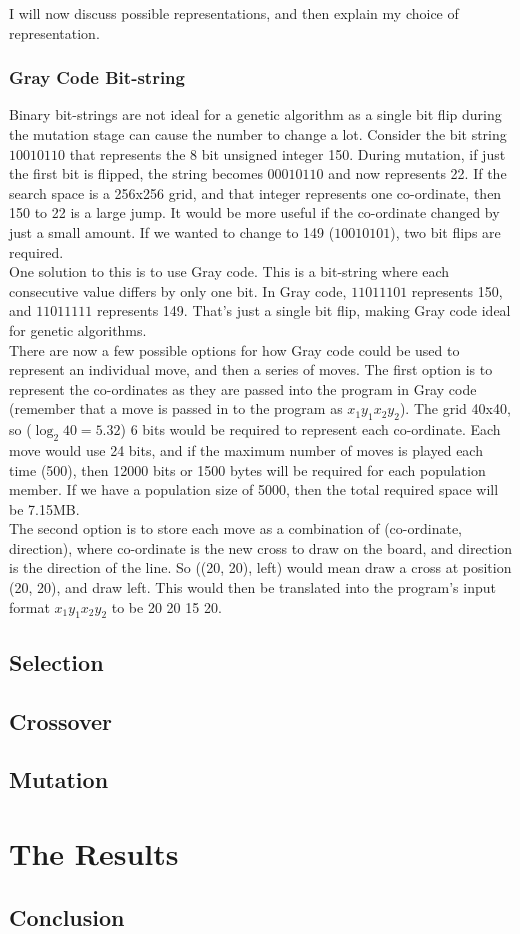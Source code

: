\documentclass[]{report}
\begin{document}
I will now discuss possible representations, and then explain my choice of representation.

\subsection{Gray Code Bit-string}

Binary bit-strings are not ideal for a genetic algorithm as a single bit flip during the mutation stage can cause the number to change a lot. Consider the bit string $10010110$ that represents the 8 bit unsigned integer 150. During mutation, if just the first bit is flipped, the string becomes $00010110$ and now represents 22. If the search space is a 256x256 grid, and that integer represents one co-ordinate, then 150 to 22 is a large jump. It would be more useful if the co-ordinate changed by just a small amount. If we wanted to change to 149 ($10010101$), two bit flips are required. \\

One solution to this is to use Gray code. This is a bit-string where each consecutive value differs by only one bit. In Gray code, $11011101$ represents 150, and $11011111$ represents 149. That's just a single bit flip, making Gray code ideal for genetic algorithms. \\

There are now a few possible options for how Gray code could be used to represent an individual move, and then a series of moves. The first option is to represent the co-ordinates as they are passed into the program in Gray code (remember that a move is passed in to the program as $x_1 y_1 x_2 y_2$). The grid 40x40, so ($\log _2 40 = 5.32$) 6 bits would be required to represent each co-ordinate. Each move would use 24 bits, and if the maximum number of moves is played each time (500), then 12000 bits or 1500 bytes will be required for each population member. If we have a population size of 5000, then the total required space will be 7.15MB.  \\

The second option is to store each move as a combination of (co-ordinate, direction), where co-ordinate is the new cross to draw on the board, and direction is the direction of the line. So ((20, 20), left) would mean draw a cross at position (20, 20), and draw left. This would then be translated into the program's input format $x_1 y_1 x_2 y_2$ to be 20 20 15 20.

\section{Selection}

\section{Crossover}

\section{Mutation}

\chapter{The Results}

\section{Conclusion}


\end{document}
